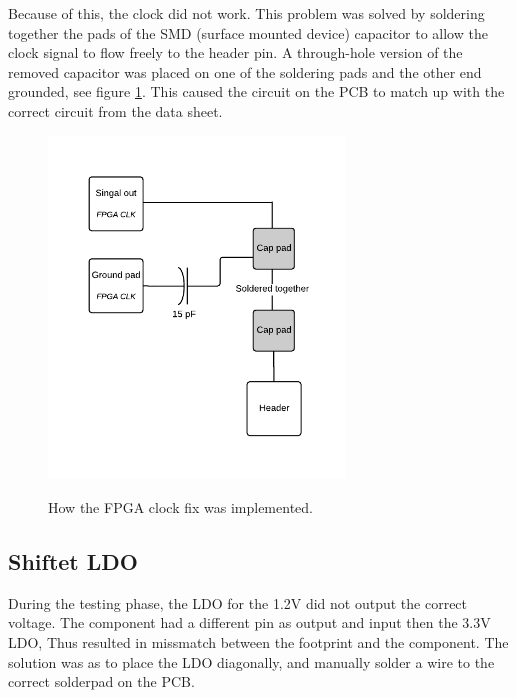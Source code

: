 \documentclass[../main/report.tex]{subfiles}
\begin{document}
Because of this, the clock did not work.
This problem was solved by soldering together the pads of the SMD (surface mounted device) capacitor to allow the clock signal to flow freely to the header pin.
A through-hole version of the removed capacitor was placed on one of the soldering pads and the other end grounded, see figure \ref{fig:pcb-clock-fix}.
This caused the circuit on the PCB to match up with the correct circuit from the data sheet.

\begin{figure}[H]
    \centering
    \includegraphics[width=0.7\textwidth]{../pcb/assets/pcb-clock-fix.pdf}
    \label{fig:pcb-clock-fix}
    \caption{How the FPGA clock fix was implemented.}
\end{figure}

\subsection{Shiftet LDO}
During the testing phase, the LDO for the 1.2V did not output the correct voltage. 
The component had a different pin as output and input then the 3.3V LDO, Thus resulted in missmatch between the footprint and the component.
The solution was as to place the LDO diagonally,  and manually solder a wire to the correct solderpad on the PCB. 
\end{document}
